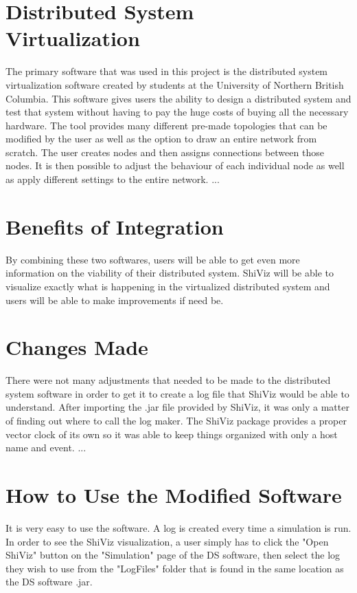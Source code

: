 \documentclass[12pt, oneside]{article}   	%
\begin{document}
\begin{twocolumn}
\section{Distributed System\\Virtualization}

The primary software that was used in this project is the distributed system virtualization software created by students at the University of Northern British Columbia.  This software gives users the ability to design a distributed system and test that system without having to pay the huge costs of buying all the necessary hardware.  The tool provides many different pre-made topologies that can be modified by the user as well as the option to draw an entire network from scratch.  The user creates nodes and then assigns connections between those nodes.  It is then possible to adjust the behaviour of each individual node as well as apply different settings to the entire network. ...

\section{Benefits of Integration}

By combining these two softwares, users will be able to get even more information on the viability of their distributed system.  ShiViz will be able to visualize exactly what is happening in the virtualized distributed system and users will be able to make improvements if need be.

\section{Changes Made}

There were not many adjustments that needed to be made to the distributed system software in order to get it to create a log file that ShiViz would be able to understand.  After importing the .jar file provided by ShiViz, it was only a matter of finding out where to call the log maker.  The ShiViz package provides a proper vector clock of its own so it was able to keep things organized with only a host name and event. ...

\section{How to Use the Modified Software}

It is very easy to use the software.  A log is created every time a simulation is run.  In order to see the ShiViz visualization, a user simply has to click the "Open ShiViz" button on the "Simulation" page of the DS software, then select the log they wish to use from the "LogFiles" folder that is found in the same location as the DS software .jar.


\end{twocolumn}
\end{document}
